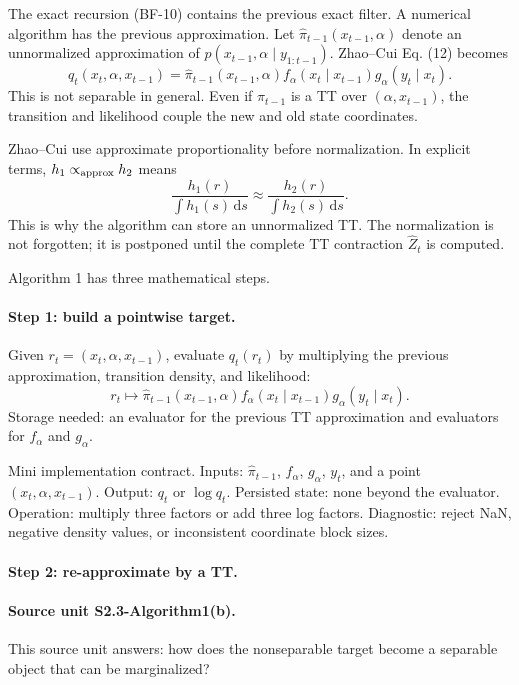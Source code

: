 \documentclass[11pt]{article}
\newcommand{\dd}{\,\mathrm d}
\begin{document}
The exact recursion (BF-10) contains the previous exact filter.  A numerical
algorithm has the previous approximation.  Let
\(\widehat\pi_{t-1}(x_{t-1},\alpha)\) denote an unnormalized approximation of
\(p(x_{t-1},\alpha\mid y_{1:t-1})\).  Zhao--Cui Eq. (12) becomes
\[
    q_t(x_t,\alpha,x_{t-1})
    =
    \widehat\pi_{t-1}(x_{t-1},\alpha)
    f_\alpha(x_t\mid x_{t-1})
    g_\alpha(y_t\mid x_t).
    \tag{A1-1}
\]
This is not separable in general.  Even if
\(\widehat\pi_{t-1}\) is a TT over \((\alpha,x_{t-1})\), the transition and
likelihood couple the new and old state coordinates.

Zhao--Cui use approximate proportionality before normalization.  In explicit
terms, \(h_1\propto_{\rm approx} h_2\) means
\[
    \frac{h_1(r)}{\int h_1(s)\dd s}
    \approx
    \frac{h_2(r)}{\int h_2(s)\dd s}.
    \tag{A1-0}
\]
This is why the algorithm can store an unnormalized TT.  The normalization is
not forgotten; it is postponed until the complete TT contraction
\(\widehat Z_t\) is computed.

Algorithm 1 has three mathematical steps.

\paragraph{Step 1: build a pointwise target.}
Given \(r_t=(x_t,\alpha,x_{t-1})\), evaluate \(q_t(r_t)\) by multiplying the
previous approximation, transition density, and likelihood:
\[
    r_t\mapsto
    \widehat\pi_{t-1}(x_{t-1},\alpha)
    f_\alpha(x_t\mid x_{t-1})
    g_\alpha(y_t\mid x_t).
\]
Storage needed: an evaluator for the previous TT approximation and evaluators
for \(f_\alpha\) and \(g_\alpha\).

Mini implementation contract.  Inputs:
\(\widehat\pi_{t-1}\), \(f_\alpha\), \(g_\alpha\), \(y_t\), and a point
\((x_t,\alpha,x_{t-1})\).  Output: \(q_t\) or \(\log q_t\).  Persisted state:
none beyond the evaluator.  Operation: multiply three factors or add three log
factors.  Diagnostic: reject NaN, negative density values, or inconsistent
coordinate block sizes.

\paragraph{Step 2: re-approximate by a TT.}
\paragraph{Source unit S2.3-Algorithm1(b).}
This source unit answers: how does the nonseparable target become a separable
object that can be marginalized?
\end{document}
